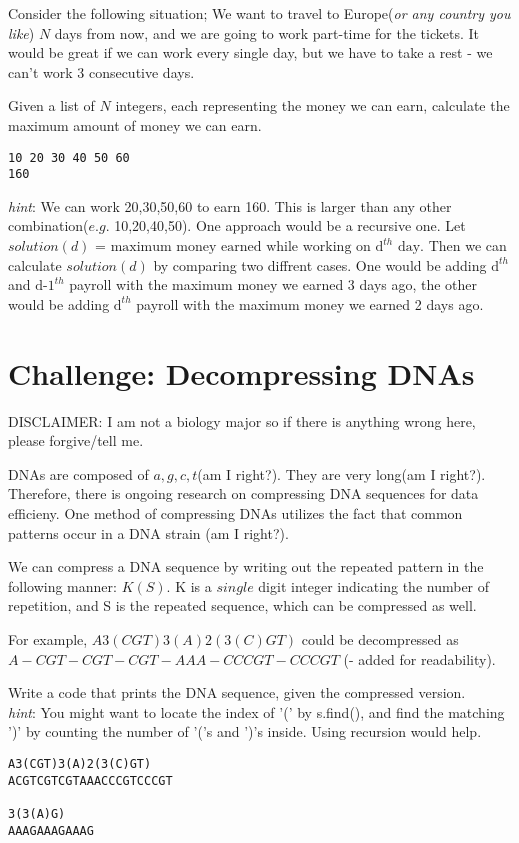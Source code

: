 \documentclass{article}
\begin{document}
Consider the following situation; We want to travel to Europe(\textit{or any
country you like}) $N$ days from now, and we are going to work part-time for
the tickets. It would be great if we can work every single day, but we have to
take a rest - we can't work 3 consecutive days.

Given a list of $N$ integers, each representing the money we can earn,
calculate the maximum amount of money we can earn.

\begin{lstlisting}
10 20 30 40 50 60 
160
\end{lstlisting}

\textit{hint}: We can work 20,30,50,60 to earn 160. This is larger than any
other combination($e.g.$ 10,20,40,50). One approach would be a recursive one.
Let $solution(d)\text{ = maximum money earned while working on $\text{d}^{th}$ day}$.
Then we can calculate $solution(d)$ by comparing two diffrent cases.
One would be adding $\text{d}^{th}$ and $\text{d-1}^{th}$ payroll with the maximum money we earned 3 days ago,
the other would be adding $\text{d}^{th}$ payroll with the maximum money we earned 2
days ago.


\section{Challenge: Decompressing DNAs}
DISCLAIMER: I am not a biology major so if there is anything wrong here, please
forgive/tell me.

DNAs are composed of $a,g,c,t$(am I right?). They are very long(am I right?).
Therefore, there is ongoing research on compressing DNA sequences for data
efficieny. One method of compressing DNAs utilizes the fact that common
patterns occur in a DNA strain (am I right?).

We can compress a DNA sequence by writing out the repeated pattern
in the following manner: $K(S)$. K is a $single$ digit integer indicating the number of
repetition, and S is the repeated sequence, which can be compressed as well.

For example, $A3(CGT)3(A)2(3(C)GT)$ could be decompressed as\\
$A-CGT-CGT-CGT-AAA-CCCGT-CCCGT$ (- added for readability).

Write a code that prints the DNA sequence, given the compressed version.\\
\textit{hint}: You might want to locate the index of '(' by s.find(), and find the
matching ')' by counting the number of '('s and ')'s inside. Using recursion
would help.

\begin{lstlisting}
A3(CGT)3(A)2(3(C)GT)
ACGTCGTCGTAAACCCGTCCCGT

3(3(A)G)
AAAGAAAGAAAG
\end{lstlisting}
\end{document}
